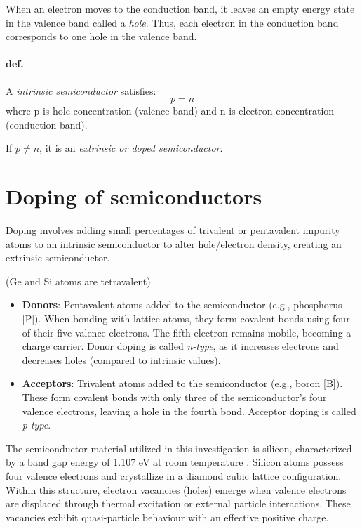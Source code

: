 When an electron moves to the conduction band, it leaves an empty energy state in the valence band called a \emph{hole}.  
Thus, each electron in the conduction band corresponds to one hole in the valence band.  

\paragraph{def.} A \emph{intrinsic semiconductor} satisfies:
\[p=n\]
where p is hole concentration (valence band) and n is electron concentration (conduction band).  

If $p\neq n$, it is an \emph{extrinsic or doped semiconductor}.
\section{Doping of semiconductors}
Doping involves adding small percentages of trivalent or pentavalent impurity atoms to an intrinsic semiconductor to alter hole/electron density, creating an extrinsic semiconductor.  

(Ge and Si atoms are tetravalent)  
\begin{itemize}
	\item \textbf{Donors}: Pentavalent atoms added to the semiconductor (e.g., phosphorus [P]).  
	When bonding with lattice atoms, they form covalent bonds using four of their five valence electrons. The fifth electron remains mobile, becoming a charge carrier.  
	Donor doping is called \emph{n-type}, as it increases electrons and decreases holes (compared to intrinsic values).
	\item \textbf{Acceptors}: Trivalent atoms added to the semiconductor (e.g., boron [B]).  
	These form covalent bonds with only three of the semiconductor's four valence electrons, leaving a hole in the fourth bond.  
	Acceptor doping is called \emph{p-type}.
\end{itemize}

The semiconductor material utilized in this investigation is silicon, characterized by a band gap energy of 1.107 eV at room temperature \cite{labguide}. Silicon atoms possess four valence electrons and crystallize in a diamond cubic lattice configuration. Within this structure, electron vacancies (holes) emerge when valence electrons are displaced through thermal excitation or external particle interactions. These vacancies exhibit quasi-particle behaviour with an effective positive charge.


